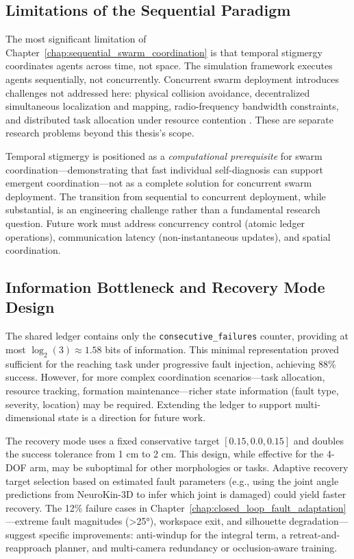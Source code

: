 \documentclass[12pt,a4paper,oneside]{report}
\begin{document}
\subsection{Limitations of the Sequential Paradigm}
\label{subsec:limitations_of_the_sequential_paradigm}

The most significant limitation of Chapter~\ref{chap:sequential_swarm_coordination} is that temporal stigmergy coordinates agents across time, not space. The simulation framework executes agents sequentially, not concurrently. Concurrent swarm deployment introduces challenges not addressed here: physical collision avoidance, decentralized simultaneous localization and mapping, radio-frequency bandwidth constraints, and distributed task allocation under resource contention \cite{matsuki2024gaussian, keetha2024splattam}. These are separate research problems beyond this thesis's scope.

Temporal stigmergy is positioned as a \textit{computational prerequisite} for swarm coordination—demonstrating that fast individual self-diagnosis can support emergent coordination—not as a complete solution for concurrent swarm deployment. The transition from sequential to concurrent deployment, while substantial, is an engineering challenge rather than a fundamental research question. Future work must address concurrency control (atomic ledger operations), communication latency (non-instantaneous updates), and spatial coordination.

\subsection{Information Bottleneck and Recovery Mode Design}
\label{subsec:information_bottleneck_and_recovery_mode_design}

The shared ledger contains only the \texttt{consecutive\_failures} counter, providing at most $\log_2(3) \approx 1.58$ bits of information. This minimal representation proved sufficient for the reaching task under progressive fault injection, achieving 88\% success. However, for more complex coordination scenarios—task allocation, resource tracking, formation maintenance—richer state information (fault type, severity, location) may be required. Extending the ledger to support multi-dimensional state is a direction for future work.

The recovery mode uses a fixed conservative target $[0.15, 0.0, 0.15]$ and doubles the success tolerance from 1 cm to 2 cm. This design, while effective for the 4-DOF arm, may be suboptimal for other morphologies or tasks. Adaptive recovery target selection based on estimated fault parameters (e.g., using the joint angle predictions from NeuroKin-3D to infer which joint is damaged) could yield faster recovery. The 12\% failure cases in Chapter~\ref{chap:closed_loop_fault_adaptation}—extreme fault magnitudes (>25°), workspace exit, and silhouette degradation—suggest specific improvements: anti-windup for the integral term, a retreat-and-reapproach planner, and multi-camera redundancy or occlusion-aware training.
\end{document}
